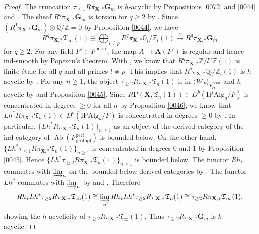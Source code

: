 \documentclass{amsart}
\theoremstyle{remark}
\numberwithin{equation}{section}
\newcommand{\isomto}{\overset{\sim}{\to}}
\newcommand{\tensor}{\mathbin{\otimes}}
\newcommand{\Z}{\mathbb{Z}}
\newcommand{\Q}{\mathbb{Q}}
\newcommand{\et}{\mathrm{et}}
\newcommand{\fppf}{\mathrm{fppf}}
\newcommand{\Gm}{\mathbf{G}_{m}}
\newcommand{\dirlim}{\varinjlim}
\newcommand{\pro}{\mathrm{pro}}
\newcommand{\perf}{\mathrm{perf}}
\newcommand{\perar}{\mathrm{perar}}
\newcommand{\Alg}{\mathrm{Alg}}
\newcommand{\Ind}{\mathrm{I}}
\newcommand{\Pro}{\mathrm{P}}
\newcommand{\alg}[1]{\mathbf{#1}}
\newcommand{\genby}[1]{\langle #1 \rangle}
\DeclareMathOperator{\Ab}{Ab}
\begin{document}
\begin{proof}
	The truncation $\tau_{\le 1} R \pi_{\alg{X}, \ast} \Gm$ is $h$-acyclic
	by Propositions \ref{0072} and \ref{0044} and \cite[Proposition 7.2]{Suz21Imp}.
	The sheaf $R^{q} \pi_{\alg{X}, \ast} \Gm$ is torsion for $q \ge 2$
	by \cite[Proposition 1.4]{Gro95Br}.
	Since $(R^{1} \pi_{\alg{X}, \ast} \Gm) \tensor \Q / \Z = 0$
	by Proposition \ref{0044},
	we have
		\[
					R^{q} \pi_{\alg{X}, \ast} \mathfrak{T}_{\infty}(1)
				\oplus
					\bigoplus_{l \ne p}
						R^{q} \pi_{\alg{X}, \ast} \Q_{l} / \Z_{l}(1)
				\isomto
					R^{q} \pi_{\alg{X}, \ast} \Gm
		\]
	for $q \ge 2$.
	For any field $F' \in F^{\perar}$, the map $A \to \alg{A}(F')$ is regular
	and hence ind-smooth by Popescu's theorem.
	With \cite[Introduction, Theorem 1]{ILO14},
	we know that $R^{q} \pi_{\alg{X}, \ast} \Z / l^{n} \Z(1)$ is finite \'etale
	for all $q$ and all primes $l \ne p$.
	This implies that $R^{q} \pi_{\alg{X}, \ast} \Q_{l} / \Z_{l}(1)$ is $h$-acyclic
	by \cite[Proposition 3.11]{Suz21Imp}.
	For any $n \ge 1$, the object $\tau_{\ge 2} R \pi_{\alg{X}, \ast} \mathfrak{T}_{n}(1)$ is
	in $\genby{\mathcal{W}_{F}}_{F^{\perar}_{\et}}$ and $h$-acyclic
	by \cite[Propositions 10.1.5 and Proposition 3.1.4]{Suz24}
	and Proposition \ref{0045}.
	Since $R \alg{\Gamma}(\alg{X}, \mathfrak{T}_{n}(1)) \in D^{b}(\Ind \Pro \Alg_{u} / F)$ is
	concentrated in degrees $\ge 0$ for all $n$ by Proposition \ref{0046},
	we know that $L h^{\ast} R \pi_{\alg{X}, \ast} \mathfrak{T}_{n}(1) \in D^{b}(\Ind \Pro \Alg_{u} / F)$
	is concentrated in degrees $\ge 0$
	by \cite[Proposition 7.6]{Suz21Imp}.
	In particular, $\{L h^{\ast} R \pi_{\alg{X}, \ast} \mathfrak{T}_{n}(1)\}_{n \ge 1}$
	as an object of the derived category of
	the ind-category of $\Ab(F^{\perf}_{\pro\fppf})$ is bounded below.
	On the other hand, $\{L h^{\ast} \tau_{\le 1} R \pi_{\alg{X}, \ast} \mathfrak{T}_{n}(1)\}_{n \ge 1}$
	is concentrated in degrees $0$ and $1$
	by Proposition \ref{0045}.
	Hence $\{L h^{\ast} \tau_{\ge 2} R \pi_{\alg{X}, \ast} \mathfrak{T}_{n}(1)\}_{n \ge 1}$
	is bounded below.
	The functor $R h_{\ast}$ commutes with $\dirlim_{n}$ on the bounded below derived categories
	by \cite[Proposition (2.2.4)]{Suz20}.
	The functor $L h^{\ast}$ commutes with $\dirlim_{n}$
	by \cite[Lemma 3.7.2]{Suz22} and \cite[Corollary 14.4.6 (ii)]{KS06}.
	Therefore
		\[
				R h_{\ast}
				L h^{\ast}
				\tau_{\ge 2}
				R \pi_{\alg{X}, \ast} \mathfrak{T}_{\infty}(1)
			\cong
				\dirlim_{n}
				R h_{\ast}
				L h^{\ast}
				\tau_{\ge 2}
				R \pi_{\alg{X}, \ast} \mathfrak{T}_{n}(1)
			\cong
				\tau_{\ge 2}
				R \pi_{\alg{X}, \ast} \mathfrak{T}_{\infty}(1),
		\]
	showing the $h$-acyclicity of $\tau_{\ge 2} R \pi_{\alg{X}, \ast} \mathfrak{T}_{\infty}(1)$.
	Thus $\tau_{\ge 2} R \pi_{\alg{X}, \ast} \Gm$ is $h$-acyclic.
\end{proof}
\end{document}
